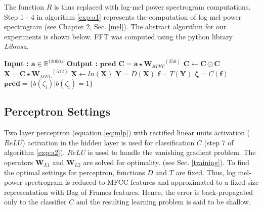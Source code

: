 \noindent The function $R$ is thus replaced with log-mel power spectrogram computations. Step 1 - 4 in algorithm \ref{exp:a1} represents the computation of log mel-power spectrogram (see Chapter 2, Sec. \ref{mel}). The abstract algorithm for our experiments is shown below. FFT was computed using the python library \textit{Librosa}\cite{Librosa}. 
\begin{algorithm}
  \caption{$\textbf{pred}$ = $Model$($\textbf{a}$) }\label{exp:a1}
  \begin{algorithmic}[1]
    \Statex \textbf{Input :} $\textbf{a} \in \mathbb{R}^{12000.t}$
    \Statex \textbf{Output :} $\textbf{pred}$ 
    \State $\textbf{C} = \textbf{a} \star {\textbf{W}_{STFT}}^{(256)}$ 
    \State $\textbf{C} \leftarrow \textbf{C} \odot \textbf{C}$
    \State $\textbf{X} = \textbf{C} \star {\textbf{W}_{MEL}}^{(512)}$ 
    \State $\textbf{X} \leftarrow ln(\textbf{X})$
    \State $\textbf{Y} = D(\textbf{X})$ 
    \State $\textbf{f} = T(\textbf{Y})$ 
    \State $\bm{\zeta} = C(\textbf{f})$ 
    \State $\textbf{pred} = \{ b(\zeta_{i}) | b(\zeta_{i}) = 1 \}$ 
  \end{algorithmic}
\end{algorithm}
\FloatBarrier

\subsection{Perceptron Settings}
\label{percentron_s}
Two layer perceptron (equation \ref{eq:mlp}) with rectified linear units activation ($ReLU$) activation in the hidden layer is used for classification $C$ (step 7 of algorithm \ref{exp:a2}). $ReLU$ is used to handle the vanishing gradient problem. The operators $\textbf{W}_{L1}$ and $\textbf{W}_{L2}$ are solved for optimality. (see Sec. \ref{training}). To find the optimal settings for perceptron, functions $D$ and $T$ are fixed. Thus, log mel-power spectrogram is reduced to MFCC features and approximated to a fixed size representation with Bag of Frames features. Hence, the error is back-propagated only to the classifier $C$ and the resulting learning problem is said to be shallow.  

